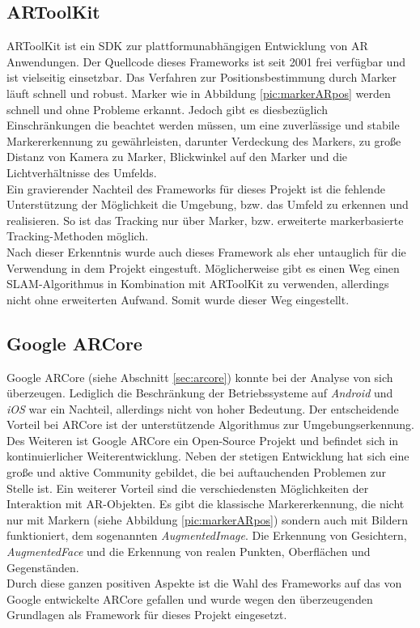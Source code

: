 \subsection{ARToolKit}
ARToolKit ist ein \acs{SDK} zur plattformunabhängigen Entwicklung von \acl{AR} Anwendungen. Der Quellcode dieses Frameworks ist seit 2001 
frei verfügbar und ist vielseitig einsetzbar. Das Verfahren zur Positionsbestimmung durch Marker läuft schnell und robust. Marker wie in 
Abbildung \ref{pic:markerARpos} werden schnell und ohne Probleme erkannt. Jedoch gibt es diesbezüglich Einschränkungen die beachtet werden 
müssen, um eine zuverlässige und stabile Markererkennung zu gewährleisten, darunter Verdeckung des Markers, zu große Distanz von Kamera 
zu Marker, Blickwinkel auf den Marker und die Lichtverhältnisse des Umfelds. 
\\ 
Ein gravierender Nachteil des Frameworks für dieses Projekt ist die fehlende Unterstützung der Möglichkeit die 
Umgebung, bzw. das Umfeld zu erkennen und realisieren. So ist das Tracking nur über Marker, bzw. erweiterte 
markerbasierte Tracking-Methoden möglich. 
\\ 
Nach dieser Erkenntnis wurde auch dieses Framework als eher untauglich für die Verwendung in dem Projekt eingestuft. Möglicherweise 
gibt es einen Weg einen \acs{SLAM}-Algorithmus in Kombination mit ARToolKit zu verwenden, allerdings nicht ohne erweiterten Aufwand. 
Somit wurde dieser Weg eingestellt. 
\subsection{Google ARCore}
Google ARCore (siehe Abschnitt \ref{sec:arcore}) konnte bei der Analyse von sich überzeugen. Lediglich die Beschränkung der
Betriebssysteme auf \textit{Android} und \textit{iOS} war ein Nachteil, allerdings nicht von hoher Bedeutung. Der entscheidende Vorteil bei 
ARCore ist der unterstützende Algorithmus zur Umgebungserkennung. Des Weiteren ist Google ARCore ein Open-Source Projekt und befindet sich 
in kontinuierlicher Weiterentwicklung. Neben der stetigen Entwicklung hat sich eine große und aktive Community gebildet, die bei auftauchenden 
Problemen zur Stelle ist. Ein weiterer Vorteil sind die verschiedensten Möglichkeiten der Interaktion mit \acs{AR}-Objekten. Es gibt die 
klassische Markererkennung, die nicht nur mit Markern (siehe Abbildung \ref{pic:markerARpos}) sondern auch mit Bildern funktioniert, dem sogenannten
\textit{AugmentedImage}. Die Erkennung von Gesichtern, \textit{AugmentedFace} und die Erkennung von realen Punkten, Oberflächen und Gegenständen.
\\
\linebreak
Durch diese ganzen positiven Aspekte ist die Wahl des Frameworks auf das von Google entwickelte ARCore gefallen und wurde wegen den überzeugenden 
Grundlagen als Framework für dieses Projekt eingesetzt.

